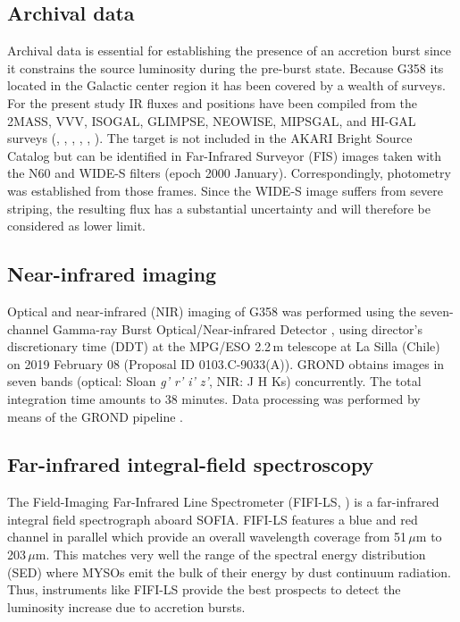 \documentclass[longauth,usenatbib]{aa}
\begin{document}
\subsection{Archival data}\label{arch}
Archival data is essential for establishing the presence of an accretion burst since it constrains the source luminosity during the pre-burst state. Because G358 its located in the Galactic center region it has been covered by a wealth of surveys. For the present study IR fluxes and positions have been compiled from the 2MASS, VVV, ISOGAL, GLIMPSE, NEOWISE, MIPSGAL, and HI-GAL surveys 
(, 
,
,
,
,
).
The target is not included in the AKARI Bright Source Catalog  but can be identified in Far-Infrared Surveyor (FIS) images taken with the N60 and WIDE-S filters (epoch 2000 January). Correspondingly, photometry was established from those frames. Since the WIDE-S image suffers from severe striping, the resulting flux has a substantial uncertainty and will therefore be considered as lower limit.


\subsection{Near-infrared imaging}\label{nir}
Optical and near-infrared (NIR) imaging of G358 was performed using the seven-channel Gamma-ray Burst Optical/Near-infrared Detector , using director's discretionary time (DDT) at the MPG/ESO 2.2\,m telescope at La Silla (Chile) on 2019 February 08 (Proposal ID 0103.C-9033(A)). GROND obtains images in seven bands (optical: Sloan {\it g' r' i' z'}, NIR: J H Ks) concurrently. The total integration time amounts to 38 minutes. Data processing was performed by means of the GROND pipeline .

\subsection{Far-infrared integral-field spectroscopy}\label{fifi}
The Field-Imaging Far-Infrared Line Spectrometer (FIFI-LS,  ) is a far-infrared integral field spectrograph aboard SOFIA. FIFI-LS features a blue and red channel in parallel which provide an overall wavelength coverage from 51\,$\mu$m to 203\,$\mu$m. This matches very well the range of the spectral energy distribution (SED) where MYSOs emit the bulk of their energy by dust continuum radiation. Thus, instruments like FIFI-LS provide the best prospects to detect the luminosity increase due to accretion bursts. 
\end{document}
